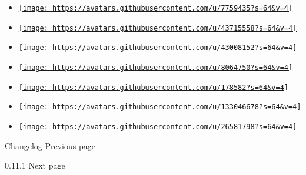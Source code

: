 \begin{itemize}
\item
  \href{https://github.com/nishanthkarthik}{\texttt{[image: https://avatars.githubusercontent.com/u/7759435?s=64\&v=4]}}
\item
  \href{https://github.com/nixon-voxell}{\texttt{[image: https://avatars.githubusercontent.com/u/43715558?s=64\&v=4]}}
\item
  \href{https://github.com/saecki}{\texttt{[image: https://avatars.githubusercontent.com/u/43008152?s=64\&v=4]}}
\item
  \href{https://github.com/unclebean}{\texttt{[image: https://avatars.githubusercontent.com/u/8064750?s=64\&v=4]}}
\item
  \href{https://github.com/waywardmonkeys}{\texttt{[image: https://avatars.githubusercontent.com/u/178582?s=64\&v=4]}}
\item
  \href{https://github.com/wrzian}{\texttt{[image: https://avatars.githubusercontent.com/u/133046678?s=64\&v=4]}}
\item
  \href{https://github.com/zombiepigdragon}{\texttt{[image: https://avatars.githubusercontent.com/u/26581798?s=64\&v=4]}}
\end{itemize}

\href{/docs/changelog/}{\pandocbounded{}}

{ Changelog } { Previous page }

\href{/docs/changelog/0.11.1/}{\pandocbounded{}}

{ 0.11.1 } { Next page }
